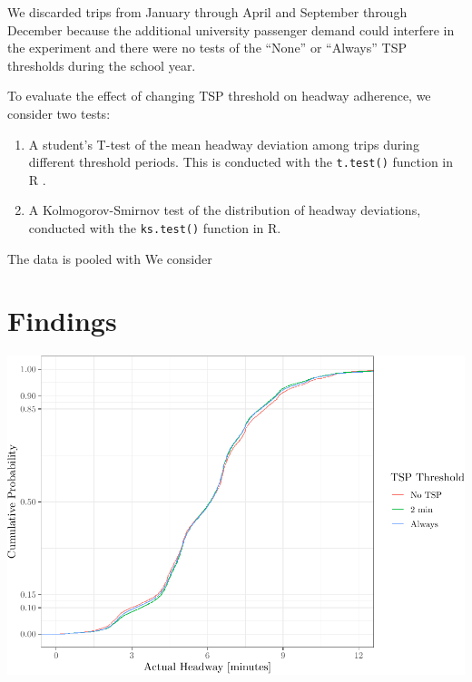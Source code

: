 \documentclass[3p, authoryear, review]{elsarticle} %
\makeatletter
\providecommand{\tightlist}{%
  \setlength{\itemsep}{0pt}\setlength{\parskip}{0pt}}
\def\maxwidth{\ifdim\Gin@nat@width>\linewidth\linewidth
\else\Gin@nat@width\fi}
\let\Oldincludegraphics\includegraphics
\renewcommand{\includegraphics}[1]{\Oldincludegraphics[width=\maxwidth]{#1}}
\makeatother
\begin{document}
We discarded trips from January through April and September through December
because the additional university passenger demand could interfere in the
experiment and there were no tests of the ``None'' or ``Always'' TSP thresholds
during the school year.

To evaluate the effect of changing TSP threshold on headway adherence, we
consider two tests:

\begin{enumerate}
\def\labelenumi{\arabic{enumi}.}
\tightlist
\item
  A student's T-test of the mean headway deviation among trips during
  different threshold periods. This is conducted with the \texttt{t.test()} function
  in R \citep{R}.
\item
  A Kolmogorov-Smirnov test of the distribution of headway deviations,
  conducted with the \texttt{ks.test()} function in R.
\end{enumerate}

The data is pooled with We consider

\hypertarget{findings}{%
\section{Findings}\label{findings}}

\includegraphics{uvx_headways_files/figure-latex/ecdf-1.pdf}


\end{document}
